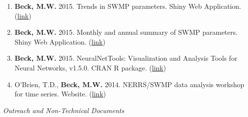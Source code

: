\documentclass[letterpaper,12pt]{article}
\begin{document}
\begin{enumerate}
\item \textbf{Beck, M.W.} 2015. Trends in SWMP parameters. Shiny Web Application. (\href{http://beckmw.shinyapps.io/swmp_comp/}{link})

\item \textbf{Beck, M.W.} 2015. Monthly and annual summary of SWMP parameters. Shiny Web Application. (\href{http://beckmw.shinyapps.io/swmp_summary/}{link})

\item \textbf{Beck, M.W.} 2015. NeuralNetTools: Visualization and Analysis Tools for Neural Networks, v1.5.0. CRAN R package. (\href{http://cran.r-project.org/web/packages/NeuralNetTools/}{link})

\item O'Brien, T.D., \textbf{Beck, M.W.} 2014. NERRS/SWMP data analysis workshop for time series. Website. (\href{http://copepod.org/nerrs-swmp-workshop/}{link})

\end{enumerate}

\vspace{\baselineskip} 
\centerline{\large{\textit{Outreach and Non-Technical Documents}}}
\end{document}
